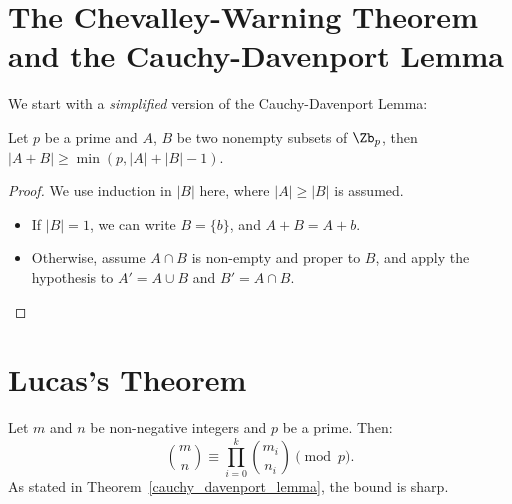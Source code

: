 \section{The Chevalley-Warning Theorem and the Cauchy-Davenport Lemma}
We start with a \emph{simplified} version of the Cauchy-Davenport Lemma:
\begin{theorem}\label{cauchy_davenport_lemma}
  Let $p$ be a prime and $A$, $B$ be two nonempty subsets of $\Zb_p$, then
  $|A+B|\geq \min(p,|A|+|B|-1)$.
\end{theorem}
\begin{proof}
  We use induction in $|B|$ here, where $|A|\geq|B|$ is assumed.
  \begin{itemize}
    \item If $|B|=1$, we can write $B=\{b\}$, and $A+B=A+b$.
    \item Otherwise, assume $A\cap B$ is non-empty and proper to $B$, and apply
          the hypothesis to $A'=A\cup B$ and $B'=A\cap B$.
  \end{itemize}
\end{proof}

\section{Lucas's Theorem}
Let $m$ and $n$ be non-negative integers and $p$ be a prime. Then:
$$\binom{m}{n} \equiv \prod_{i=0}^{k} \binom{m_i}{n_i} \pmod{p}.$$
As stated in Theorem~\ref{cauchy_davenport_lemma}, the bound is sharp.
